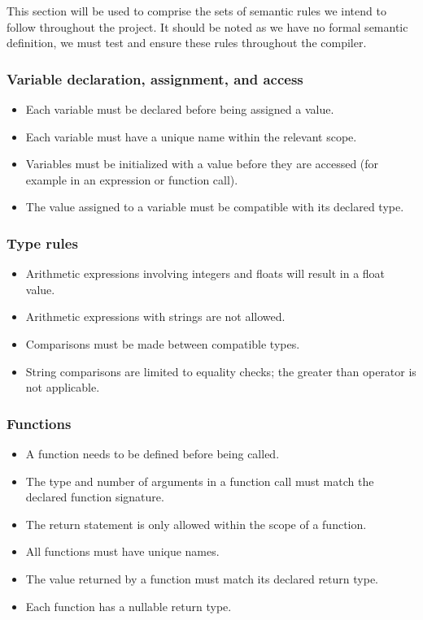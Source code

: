 This section will be used to comprise the sets of semantic rules we intend to follow throughout the project.
It should be noted as we have no formal semantic definition, we must test and ensure these rules throughout the
compiler.

\subsubsection{Variable declaration, assignment, and access}

\begin{itemize}
    \item Each variable must be declared before being assigned a value.
    \item Each variable must have a unique name within the relevant scope.
    \item Variables must be initialized with a value before they are accessed (for example in an expression or function call).
    \item The value assigned to a variable must be compatible with its declared type.
\end{itemize}

\subsubsection{Type rules}

\begin{itemize}
    \item Arithmetic expressions involving integers and floats will result in a float value.
    \item Arithmetic expressions with strings are not allowed.
    \item Comparisons must be made between compatible types.
    \item String comparisons are limited to equality checks; the greater than operator is not applicable.
    \end{itemize}

\subsubsection{Functions}

\begin{itemize}
    \item A function needs to be defined before being called.
    \item The type and number of arguments in a function call must match the declared function signature.
    \item The return statement is only allowed within the scope of a function.
    \item All functions must have unique names.
    \item The value returned by a function must match its declared return type.
    \item Each function has a nullable return type.
    \end{itemize}

